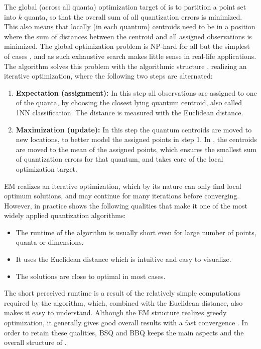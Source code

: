 			The global (across all quanta) optimization target of \kmeans{} is to partition a point set into $k$ quanta, so that the overall sum of all quantization errors is minimized.
			This also means that locally (in each quantum) centroids need to be in a position where the sum of distances between the centroid and all assigned observations is minimized.
			The global optimization problem is NP-hard for all but the simplest of cases \cite{kmeanscomp}, and as such exhaustive search makes little sense in real-life applications.
			The \kmeans{} algorithm solves this problem with the  algorithmic structure \cite{em}, realizing an iterative optimization, where the following two steps are alternated:
			\begin{enumerate}
				\item \textbf{Expectation (assignment):} In this step all observations are assigned to one of the quanta, by choosing the closest lying quantum centroid, also called \ac{1NN} classification.
				The distance is measured with the Euclidean distance. 
				\item \textbf{Maximization (update):} In this step the quantum centroids are moved to new locations, to better model the assigned points in step 1.
				In \kmeans{}, the centroids are moved to the mean of the assigned points, which ensures the smallest sum of quantization errors for that quantum, and takes care of the local optimization target.
			\end{enumerate}
			
			\ac{EM} realizes an iterative optimization, which by its nature can only find local optimum solutions, and may continue for many iterations before converging. However, in practice \kmeans{} shows the following qualities that make it one of the most widely applied quantization algorithms:
			\begin{itemize}
				\item The runtime of the algorithm is usually short even for large number of points, quanta or dimensions.
				\item It uses the Euclidean distance which is intuitive and easy to visualize.
				\item The solutions are close to optimal in most cases.
			\end{itemize}
			\noindent The short perceived runtime is a result of the relatively simple computations required by the algorithm, which, combined with the Euclidean distance, also makes it easy to understand.
			Although the \ac{EM} structure realizes greedy optimization, it generally gives good overall results with a fast convergence \cite{lloydeffective}.
			In order to retain these qualities, \ac{BSQ} and \ac{BBQ} keeps the main aspects and the overall structure of \kmeans{}.
			
